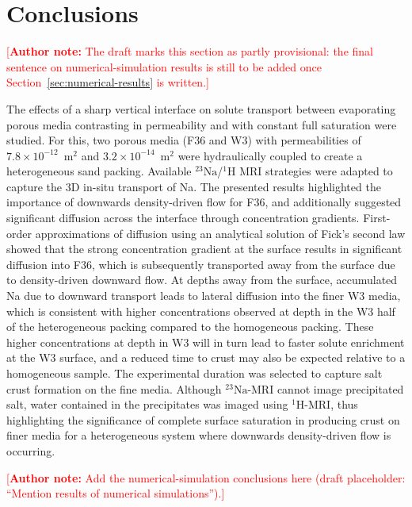 \documentclass[final]{agujournal2019}
\newcommand{\authornote}[1]{%
  \par\noindent\textcolor{red}{\small[\textbf{Author note:} #1]}\par}
\newcommand{\NaIso}{\ensuremath{^{23}\mathrm{Na}}}
\newcommand{\HIso}{\ensuremath{^{1}\mathrm{H}}}
\begin{document}
\section{Conclusions} \label{sec:conclusions}

\authornote{The draft marks this section as partly provisional: the final
sentence on numerical-simulation results is still to be added once
Section~\ref{sec:numerical-results} is written.}

The effects of a sharp vertical interface on solute transport between evaporating
porous media contrasting in permeability and with constant full saturation were
studied. For this, two porous media (F36 and W3) with permeabilities of
$7.8\times10^{-12}$~m$^2$ and $3.2\times10^{-14}$~m$^2$ were hydraulically
coupled to create a heterogeneous sand packing. Available \NaIso/\HIso{} MRI
strategies were adapted to capture the 3D in-situ transport of Na. The presented
results highlighted the importance of downwards density-driven flow for F36, and
additionally suggested significant diffusion across the interface through
concentration gradients. First-order approximations of diffusion using an
analytical solution of Fick's second law showed that the strong concentration
gradient at the surface results in significant diffusion into F36, which is
subsequently transported away from the surface due to density-driven downward
flow. At depths away from the surface, accumulated Na due to downward transport
leads to lateral diffusion into the finer W3 media, which is consistent with
higher concentrations observed at depth in the W3 half of the heterogeneous
packing compared to the homogeneous packing. These higher concentrations at depth
in W3 will in turn lead to faster solute enrichment at the W3 surface, and a
reduced time to crust may also be expected relative to a homogeneous sample. The
experimental duration was selected to capture salt crust formation on the fine
media. Although \NaIso-MRI cannot image precipitated salt, water contained in the
precipitates was imaged using \HIso-MRI, thus highlighting the significance of
complete surface saturation in producing crust on finer media for a heterogeneous
system where downwards density-driven flow is occurring.

\authornote{Add the numerical-simulation conclusions here (draft placeholder:
``Mention results of numerical simulations'').}
\end{document}
